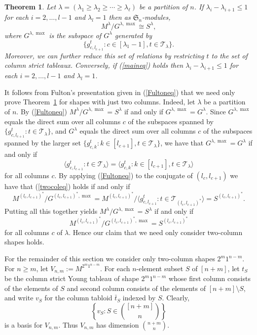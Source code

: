 \documentclass[12pt]{amsart}
\numberwithin{equation}{section}
\def\sg{\mathfrak S}
\newtheorem{theorem}{Theorem}[section]
\begin{document}
\begin{theorem} \label{mainth2} Let $\lambda = (\lambda_1 \ge \lambda_2 \ge \cdots \ge \lambda_\ell)$ be a partition of $n$.  If  $\lambda_i -\lambda_{i+1} \le 1$ for each $i = 2,\dots,l-1$ and $\lambda_l=1$ then  as $\sg_n$-modules,
\begin{equation} \label{maineq} M^{\lambda} / G^{\lambda,\max} \cong S^{\lambda} ,\end{equation} where
 $G^{\lambda,\max}$ is the subspace of $G^\lambda$ generated by $$\{ g^t_{c,l_{c+1}} : c \in [\lambda_1-1], t \in \mathcal T_\lambda \}  .$$
Moreover, we can further reduce this set of relations by restricting $t$ to the set of column strict tableaux.  Conversely, if (\ref{maineq}) holds then $\lambda_i -\lambda_{i+1} \le 1$ for each $i = 2,\dots,l-1$ and $\lambda_l=1$.
\end{theorem} 

It  follows from Fulton's presentation given in (\ref{Fultoneq}) that we need only  prove Theorem~\ref{mainth2} for shapes  with   just two columns.  Indeed, let $\lambda$ be a partition of $n$. By (\ref{Fultoneq}) $M^\lambda / G^{\lambda, \max} = S^\lambda$ if and only if $G^{\lambda, \max} = G^\lambda$.  
Since $G^{\lambda, \max}$ equals the direct sum over all columns $ c$ of the subspaces spanned by  $\{g^t_{c,l_{c+1}}:  t \in \mathcal T_\lambda\}$, and $G^{\lambda}$ equals the direct sum over all columns $ c$ of the subspaces spanned by  the larger set $\{g^t_{c,k}: k \in [l_{c+1}], t \in \mathcal T_\lambda\}$, we have that $G^{\lambda, \max} = G^\lambda$ if and only if 
\begin{equation} \label{twocoleq} \langle g^t_{c,l_{c+1}}:  t \in \mathcal T_\lambda\rangle= \langle g^t_{c,k}: k \in [l_{c+1}], t \in \mathcal T_\lambda\rangle\end{equation} for all columns $c$.
By applying (\ref{Fultoneq})  to the  conjugate of $(l_c,l_{c+1})$ we have that (\ref{twocoleq}) holds if and only if 
$$M^{(l_c,l_{c+1})^*} / G^{(l_c,l_{c+1})^*,\max} = M^{(l_c,l_{c+1})^*} / \langle g^t_{c,l_{c+1}}:  t \in \mathcal T_{(l_c, l_{c+1} )^*}\rangle = S^{(l_c,l_{c+1})^*}.$$
Putting all this together yields $M^\lambda / G^{\lambda, \max} = S^\lambda$ if and only if $$M^{(l_c,l_{c+1})^*} / G^{(l_c,l_{c+1})^*,\max} = S^{(l_c,l_{c+1})^*}$$ for all columns $c$ of $\lambda$.  Hence our claim that we  need only consider  two-column shapes holds.
 

For the remainder of this section we consider only two-column shapes $2^m1^{n-m}$.
For $n \ge m$, let $V_{n,m} := M^{2^m1^{n-m}}$. For each $n$-element subset $S$ of $[n+m]$,  let $t_S$ be  the column strict Young tableau of shape $2^m1^{n-m}$ whose first column consists of the elements of $S$ and   second column consists of the elements of $[n+m] \setminus S $, and write  $v_S$ for the column  tabloid  $ \bar t_S$ indexed by $S$.  
Clearly, 
\begin{equation} \label{basiseq} \left \{ v_S : S \in \binom{[n+m]}{n}\right \}\end{equation} 
is a basis for $V_{n,m}$.  Thus $V_{n,m}$ has dimension $\binom{n+m}{n}$.
\end{document}
